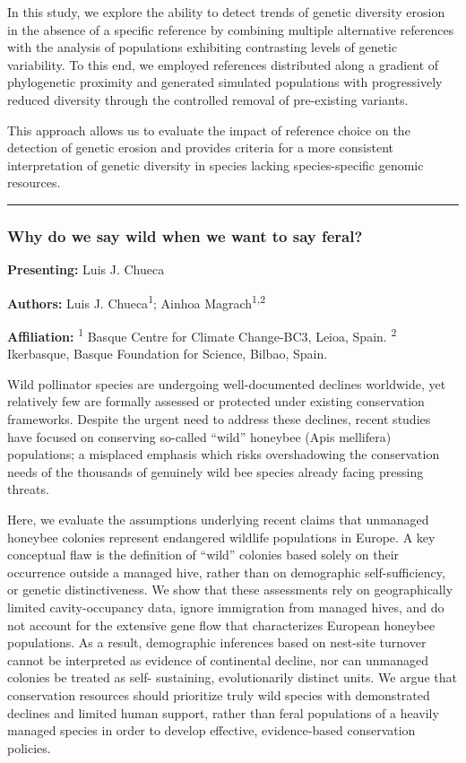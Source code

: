 \documentclass[
  letterpaper,
  DIV=11,
  numbers=noendperiod]{scrartcl}
\begin{document}
In this study, we explore the ability to detect trends of genetic
diversity erosion in the absence of a specific reference by combining
multiple alternative references with the analysis of populations
exhibiting contrasting levels of genetic variability. To this end, we
employed references distributed along a gradient of phylogenetic
proximity and generated simulated populations with progressively reduced
diversity through the controlled removal of pre-existing variants.

This approach allows us to evaluate the impact of reference choice on
the detection of genetic erosion and provides criteria for a more
consistent interpretation of genetic diversity in species lacking
species-specific genomic resources.

\begin{center}\rule{0.5\linewidth}{0.5pt}\end{center}

\subsubsection{Why do we say wild when we want to say
feral?}\label{why-do-we-say-wild-when-we-want-to-say-feral}

\textbf{Presenting:} Luis J. Chueca

\textbf{Authors:} Luis J. Chueca\textsuperscript{1}; Ainhoa
Magrach\textsuperscript{1,2}

\textbf{Affiliation:} \textsuperscript{1} Basque Centre for Climate
Change-BC3, Leioa, Spain. \textsuperscript{2} Ikerbasque, Basque
Foundation for Science, Bilbao, Spain.

Wild pollinator species are undergoing well-documented declines
worldwide, yet relatively few are formally assessed or protected under
existing conservation frameworks. Despite the urgent need to address
these declines, recent studies have focused on conserving so-called
``wild'' honeybee (Apis mellifera) populations; a misplaced emphasis
which risks overshadowing the conservation needs of the thousands of
genuinely wild bee species already facing pressing threats.

Here, we evaluate the assumptions underlying recent claims that
unmanaged honeybee colonies represent endangered wildlife populations in
Europe. A key conceptual flaw is the definition of ``wild'' colonies
based solely on their occurrence outside a managed hive, rather than on
demographic self-sufficiency, or genetic distinctiveness. We show that
these assessments rely on geographically limited cavity-occupancy data,
ignore immigration from managed hives, and do not account for the
extensive gene flow that characterizes European honeybee populations. As
a result, demographic inferences based on nest-site turnover cannot be
interpreted as evidence of continental decline, nor can unmanaged
colonies be treated as self- sustaining, evolutionarily distinct units.
We argue that conservation resources should prioritize truly wild
species with demonstrated declines and limited human support, rather
than feral populations of a heavily managed species in order to develop
effective, evidence-based conservation policies.
\end{document}
